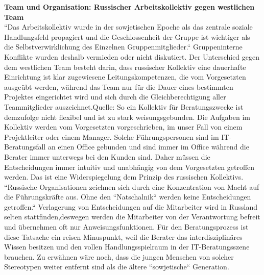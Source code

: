 	\textbf{Team und Organisation: Russischer Arbeitskollektiv gegen westlichen Team}\\
	``Das Arbeitskollektiv wurde in der sowjetischen 
	Epoche als das zentrale soziale Handlungsfeld propagiert und die Geschlossenheit der Gruppe ist wichtiger als die Selbstverwirklichung des Einzelnen Gruppenmitglieder.`` Gruppeninterne Konflikte wurden deshalb vermieden oder nicht diskutiert. Der Unterschied gegen dem westlichen Team besteht darin, dass russischer Kollektiv eine dauerhafte Einrichtung ist klar zugewiesene Leitungskompetenzen, die vom Vorgesetzten ausgeübt werden, während das Team nur für die Dauer eines bestimmten Projektes eingerichtet wird und sich durch die Gleichberechtigung aller Teammitglieder auszeichnet.Quelle:
	So ein Kollektiv für Beratungszwecke ist demzufolge nicht flexibel und ist zu stark weisungsgebunden. Die Aufgaben im Kollektiv werden vom Vorgesetzten vorgeschrieben, im unser Fall von einem Projektleiter oder einem Manager. Solche Führungspersonen sind im IT-Beratungsfall an einen Office gebunden und sind immer im Office während die Berater immer unterwegs bei den Kunden sind. Daher müssen die Entscheidungen immer intuitiv und unabhängig von dem Vorgesetzten getroffen werden. Das ist eine Widerspiegelung dem Prinzip des russischen Kollektivs. ``Russische Organisationen zeichnen sich durch eine Konzentration von Macht auf die Führungskräfte aus. Ohne den ``Natschalnik`` werden keine Entscheidungen getroffen.`` %
	Verlagerung von Entscheidungen auf die Mitarbeiter wird in Russland selten stattfinden,deswegen werden die Mitarbeiter von der Verantwortung befreit und übernehmen oft nur Anweisungsfunktionen. Für  den Beratungsprozess ist diese Tatsache ein reisen Minuspunkt, weil die Berater das interdisziplinäres Wissen besitzen und  den vollen Handlungsspielraum in der IT-Beratungsszene brauchen.
	Zu erwähnen wäre noch, dass die jungen Menschen von solcher Stereotypen weiter entfernt sind als die ältere ``sowjetische`` Generation. \\

